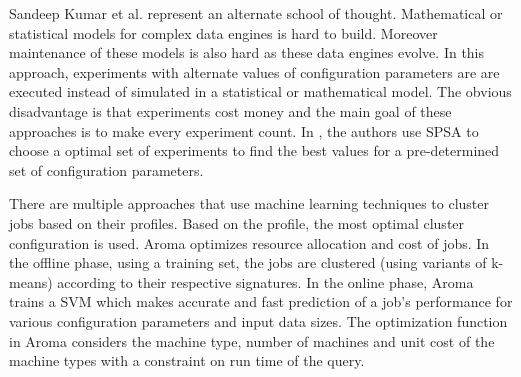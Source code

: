 Sandeep Kumar et al.\cite{KumarPLPGB16} represent an alternate school of thought.
Mathematical or statistical models for complex data engines is hard to build. Moreover maintenance of these models 
is also hard as these data engines evolve. In this approach, experiments
with alternate values of configuration parameters are are executed instead of simulated in a 
statistical or mathematical model. The obvious disadvantage is that experiments cost money and the main 
goal of these approaches is to make every experiment count. In \cite{KumarPLPGB16}, the authors use SPSA to 
choose a optimal set of experiments to find the best values for a pre-determined set of configuration parameters.

There are multiple approaches \cite{wu2013self} \cite{lama2012aroma} that use machine learning techniques
to cluster jobs based on their profiles. Based on the profile, the most optimal cluster configuration is
used. Aroma \cite{lama2012aroma} optimizes resource allocation and cost of jobs. In
the offline phase, using a training set, the jobs are clustered
(using variants of k-means) according to their respective signatures.
In the online phase, Aroma trains a SVM which makes
accurate and fast prediction of a job's performance for various
configuration parameters and input data sizes. The optimization function in Aroma considers
the machine type, number of machines and unit cost of the machine types with a constraint on
run time of the query. 
  
